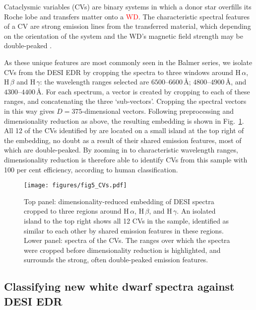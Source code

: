 \documentclass[fleqn,usenatbib]{mnras}
\newcommand{\red}[1]{\textcolor{red}{#1}}
\begin{document}
Cataclysmic variables (CVs) are binary systems in which a donor star overfills its Roche lobe and transfers matter onto a \red{WD}.
The characteristic spectral features of a CV are strong emission lines from the transferred material, which depending on the orientation of the system and the WD's magnetic field strength may be double-peaked \citep{smak69, huang72}.

As these unique features are most commonly seen in the Balmer series, we isolate CVs from the DESI EDR by cropping the spectra to three windows around H$\,\alpha$, H$\,\beta$ and H$\,\gamma$:
the wavelength ranges selected are $6500$--$6600\,\text{\AA}$; $4800$--$4900\,\text{\AA}$, and $4300$--$4400\,\text{\AA}$.
For each spectrum, a vector is created by cropping to each of these ranges, and concatenating the three `sub-vectors'.
Cropping the spectral vectors in this way gives $D=375$-dimensional vectors.
Following preprocessing and dimensionality reduction as above, the resulting embedding is shown in Fig.~\ref{fig:CVs}.
All 12 of the CVs identified by \citet{manser24} are located on a small island at the top right of the embedding, no doubt as a result of their shared emission features, most of which are double-peaked.
By zooming in to characteristic wavelength ranges, dimensionality reduction is therefore able to identify CVs from this sample with 100 per cent efficiency, according to human classification.

\begin{figure}
\centering
\texttt{[image: figures/fig5\_CVs.pdf]}
\caption{
    Top panel: dimensionality-reduced embedding of DESI spectra cropped to three regions around H\,$\alpha$, H\,$\beta$, and H\,$\gamma$.
    An isolated island to the top right shows all 12 CVs in the sample, identified as similar to each other by shared emission features in these regions.
    Lower panel: spectra of the CVs.
    The ranges over which the spectra were cropped before dimensionality reduction is highlighted, and surrounds the strong, often double-peaked emission features.
}
\label{fig:CVs}
\end{figure}


\subsection{Classifying new white dwarf spectra against DESI EDR}
\end{document}
